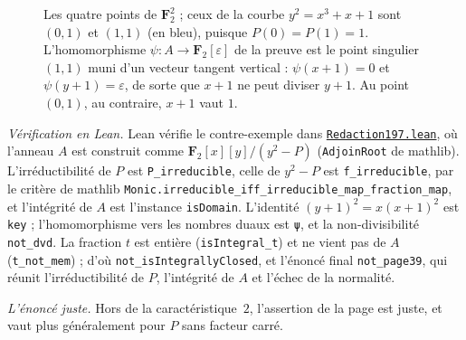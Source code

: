 \begin{figure}[htbp]
\centering
{}
\caption{Les quatre points de $\mathbf F_2^2$ ; ceux de la courbe $y^2 = x^3 + x + 1$ sont $(0, 1)$ et $(1, 1)$ (en bleu), puisque $P(0) = P(1) = 1$. L'homomorphisme $\psi : A \to \mathbf F_2[\varepsilon]$ de la preuve est le point singulier $(1, 1)$ muni d'un vecteur tangent vertical : $\psi(x + 1) = 0$ et $\psi(y + 1) = \varepsilon$, de sorte que $x + 1$ ne peut diviser $y + 1$. Au point $(0, 1)$, au contraire, $x + 1$ vaut $1$.}
\label{fig:bourbaki-197}
\end{figure}

\emph{Vérification en Lean.} Lean vérifie le contre-exemple dans \href{\leanblobmain/Redaction197.lean}{\texttt{Redaction197.\allowbreak{}lean}}, où l'anneau $A$ est construit comme $\mathbf F_2[x][y]/(y^2 - P)$ (\texttt{AdjoinRoot} de mathlib). L'irréductibilité de $P$ est \texttt{P\_irreducible}, celle de $y^2 - P$ est \texttt{f\_irreducible}, par le critère de mathlib \texttt{Monic.\allowbreak{}irreducible\_iff\_irreducible\_map\_fraction\_map}, et l'intégrité de $A$ est l'instance \texttt{isDomain}. L'identité $(y + 1)^2 = x(x + 1)^2$ est \texttt{key} ; l'homomorphisme vers les nombres duaux est \texttt{ψ}, et la non-divisibilité \texttt{not\_dvd}. La fraction $t$ est entière (\texttt{isIntegral\_t}) et ne vient pas de $A$ (\texttt{t\_not\_mem}) ; d'où \texttt{not\_isIntegrallyClosed}, et l'énoncé final \texttt{not\_page39}, qui réunit l'irréductibilité de $P$, l'intégrité de $A$ et l'échec de la normalité.

\emph{L'énoncé juste.} Hors de la caractéristique~$2$, l'assertion de la page est juste, et vaut plus généralement pour $P$ sans facteur carré.

